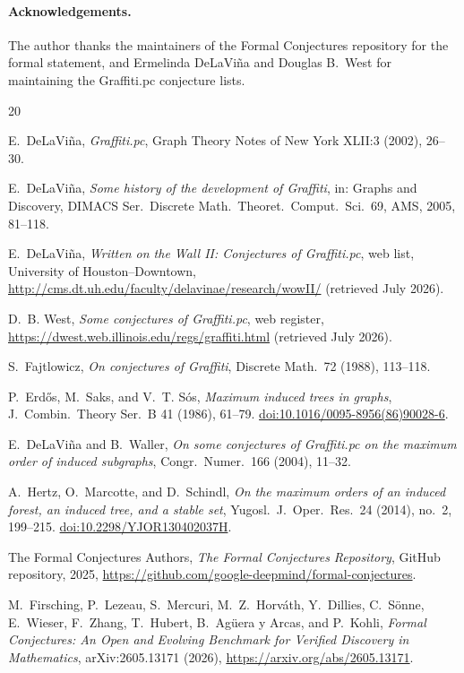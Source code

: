 \documentclass[11pt]{article}
\numberwithin{equation}{section}
\theoremstyle{remark}
\begin{document}
\paragraph{Acknowledgements.}
The author thanks the maintainers of the Formal Conjectures repository for
the formal statement, and Ermelinda DeLaVi\~na and Douglas B.\ West for
maintaining the Graffiti.pc conjecture lists.

\begin{thebibliography}{20}

E.~DeLaVi\~na,
\emph{Graffiti.pc},
Graph Theory Notes of New York XLII:3 (2002), 26--30.

E.~DeLaVi\~na,
\emph{Some history of the development of Graffiti},
in: Graphs and Discovery, DIMACS Ser.\ Discrete Math.\ Theoret.\ Comput.\
Sci.\ 69, AMS, 2005, 81--118.

E.~DeLaVi\~na,
\emph{Written on the Wall II: Conjectures of Graffiti.pc},
web list, University of Houston--Downtown,
\url{http://cms.dt.uh.edu/faculty/delavinae/research/wowII/}
(retrieved July 2026).

D.~B. West,
\emph{Some conjectures of Graffiti.pc}, web register,
\url{https://dwest.web.illinois.edu/regs/graffiti.html}
(retrieved July 2026).

S.~Fajtlowicz,
\emph{On conjectures of Graffiti},
Discrete Math.\ 72 (1988), 113--118.

P.~Erd\H{o}s, M.~Saks, and V.~T. S\'os,
\emph{Maximum induced trees in graphs},
J.~Combin.\ Theory Ser.\ B 41 (1986), 61--79.
\href{https://doi.org/10.1016/0095-8956(86)90028-6}
{doi:10.1016/0095-8956(86)90028-6}.

E.~DeLaVi\~na and B.~Waller,
\emph{On some conjectures of Graffiti.pc on the maximum order of induced
subgraphs},
Congr.\ Numer.\ 166 (2004), 11--32.

A.~Hertz, O.~Marcotte, and D.~Schindl,
\emph{On the maximum orders of an induced forest, an induced tree, and a
stable set},
Yugosl.\ J.\ Oper.\ Res.\ 24 (2014), no.~2, 199--215.
\href{https://doi.org/10.2298/YJOR130402037H}{doi:10.2298/YJOR130402037H}.

The Formal Conjectures Authors,
\emph{The Formal Conjectures Repository},
GitHub repository, 2025,
\url{https://github.com/google-deepmind/formal-conjectures}.

M.~Firsching, P.~Lezeau, S.~Mercuri, M.~Z.~Horv\'ath, Y.~Dillies,
C.~S\"onne, E.~Wieser, F.~Zhang, T.~Hubert, B.~Ag\"uera y Arcas,
and P.~Kohli,
\emph{Formal Conjectures: An Open and Evolving Benchmark for Verified
Discovery in Mathematics}, arXiv:2605.13171 (2026),
\url{https://arxiv.org/abs/2605.13171}.


\end{thebibliography}
\end{document}
